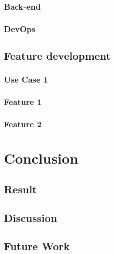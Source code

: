 \documentclass{article}
\begin{document}
        \subsubsection{Back-end}
        
        \subsubsection{DevOps}
        
    \subsection{Feature development} 
        \subsubsection{Use Case 1}
        \subsubsection{Feature 1}
        \subsubsection{Feature 2}    
\pagebreak
\section{Conclusion} 
    \subsection{Result}
    \subsection{Discussion}
    \subsection{Future Work}
\pagebreak
% 
\pagebreak
\end{document}
